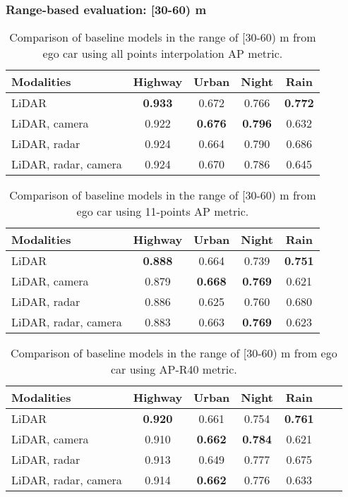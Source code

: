 \documentclass{article}
\begin{document}
\newpage
\subsubsection{Range-based evaluation: [30-60) m}

\begin{table*}[!h]
  \small
  \centering
  \begin{tabular}{@{}l|cccc@{}}
    \toprule
    Modalities          & Highway   & Urban     & Night     & Rain  \\
    \midrule
    LiDAR               & \bf{0.933}& 0.672     & 0.766     & \bf{0.772} \\
    LiDAR, camera       & 0.922     & \bf{0.676}& \bf{0.796}& 0.632 \\
    LiDAR, radar        & 0.924     & 0.664     & 0.790     & 0.686 \\
    LiDAR, radar, camera & 0.924    & 0.670     & 0.786     & 0.645 \\
    \bottomrule
  \end{tabular}
  \caption{Comparison of baseline models in the range of [30-60) m from ego car using all points interpolation AP metric.}
  \label{tab:metrics5}
\end{table*}

\begin{table*}[!h]
  \small
  \centering
  \begin{tabular}{@{}l|cccc@{}}
    \toprule
    Modalities          & Highway   & Urban     & Night     & Rain \\
    \midrule
    LiDAR               & \bf{0.888}& 0.664     & 0.739     & \bf{0.751} \\
    LiDAR, camera       & 0.879     & \bf{0.668}& \bf{0.769}& 0.621 \\
    LiDAR, radar        & 0.886     & 0.625     & 0.760     & 0.680 \\
    LiDAR, radar, camera & 0.883    & 0.663     & \bf{0.769}& 0.623 \\
    \bottomrule
  \end{tabular}
  \caption{Comparison of baseline models in the range of [30-60) m from ego car using 11-points AP metric.}
  \label{tab:metrics6}
\end{table*}

\begin{table*}[!h]
  \small
  \centering
  \begin{tabular}{@{}l|cccccc@{}}
    \toprule
    Modalities          & Highway   & Urban     & Night     & Rain \\
    \midrule
    LiDAR               & \bf{0.920}& 0.661     & 0.754     & \bf{0.761} \\
    LiDAR, camera       & 0.910     & \bf{0.662}& \bf{0.784}& 0.621 \\
    LiDAR, radar        & 0.913     & 0.649     & 0.777     & 0.675 \\
    LiDAR, radar, camera & 0.914    & \bf{0.662}& 0.776     & 0.633 \\
    \bottomrule
  \end{tabular}
  \caption{Comparison of baseline models in the range of [30-60) m from ego car using AP-R40 metric.}
  \label{tab:metrics7}
\end{table*}
\end{document}
